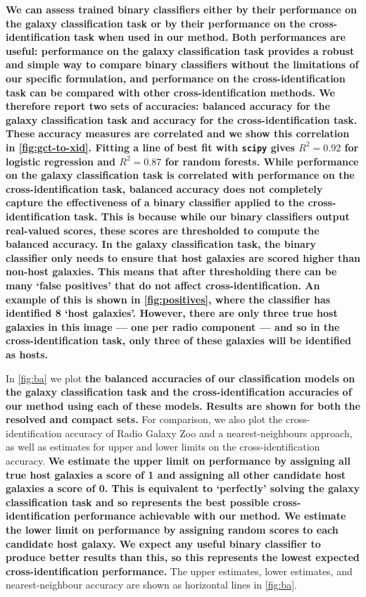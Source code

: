 \documentclass[fleqn,usenatbib,usedcolumn]{mnras}
\newcommand{\edited}[1]{{\bf {#1}}}
\begin{document}
    \edited{We can assess trained binary classifiers either by their performance on
    the galaxy classification task or by their performance on the
    cross-identification task when used in our method. Both performances are
    useful: performance on the galaxy classification task provides a robust
    and simple way to compare binary classifiers without the limitations of
    our specific formulation, and performance on the cross-identification task
    can be compared with other cross-identification methods. We therefore
    report two sets of accuracies: balanced accuracy for the galaxy
    classification task and accuracy for the cross-identification task. These
    accuracy measures are correlated and we show this correlation in
    \autoref{fig:gct-to-xid}. Fitting a line of best fit with \texttt{scipy}
    gives $R^2 = 0.92$ for logistic regression and $R^2 = 0.87$ for random
    forests. While performance on the galaxy classification task is correlated
    with performance on the cross-identification task, balanced accuracy does
    not completely capture the effectiveness of a binary classifier applied to
    the cross-identification task. \edited{This is because while our binary
    classifiers output real-valued scores, these scores are thresholded to
    compute the balanced accuracy}. In the galaxy classification
    task, the binary classifier only needs to ensure that host galaxies are
    \edited{scored higher} than non-host galaxies. This means
    \edited{that after thresholding} there can be
    many `false positives' that do not affect cross-identification. An example
    of this is shown in \autoref{fig:positives}, where the classifier has
    identified 8 `host galaxies'. However, there are only three true host
    galaxies in this image --- one per radio component --- and so in the
    cross-identification task, only three of these galaxies will be identified
    as hosts.}

    In \autoref{fig:ba} we plot \edited{the balanced accuracies of our classification models
    on the galaxy classification task and the cross-identification
    accuracies of our method using each of these models. Results are shown for both
    the resolved and compact sets.} For comparison, we also plot the cross-identification accuracy of Radio Galaxy
    Zoo and a nearest-neighbours approach, as well as estimates for upper and
    lower limits on the cross-identification accuracy. \edited{We estimate the upper limit on performance by assigning all
    true host galaxies a score of 1 and
    assigning all other candidate host galaxies a score of 0. This
    is equivalent to `perfectly' solving the galaxy classification task and so
    represents the best possible cross-identification performance achievable
    with our method. We estimate the lower limit on performance by \edited{
    assigning random scores to each candidate host galaxy}. We expect any
    useful binary classifier to produce better
    results than this, so this represents the lowest expected
    cross-identification performance.} The upper estimates, lower estimates,
    and nearest-neighbour accuracy are shown as horizontal lines in
    \autoref{fig:ba}.
\end{document}
